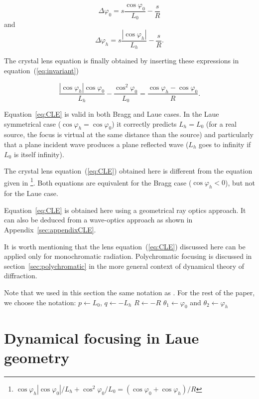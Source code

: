 \documentclass[preprint]{iucr}              %
\newcommand{\inblue}[1]{{\color{blue}#1}}
\begin{document}
\begin{equation}
\label{angles}
\Delta \varphi_0 = s \frac{\cos\varphi_0}{L_0} - \frac{s}{R}
\end{equation}
and 
\begin{equation}
\Delta \varphi_h = s \frac{|\cos\varphi_h|}{L_h} - \frac{s}{R}.
\end{equation}

The crystal lens equation is finally obtained by inserting these expressions in equation~(\ref{eq:invariant})

\begin{equation}
\label{eq:CLE}
\frac{|\cos\varphi_h| \cos\varphi_0}{L_h} - \frac{\cos^2\varphi_0}{L_0} = \frac{\cos\varphi_h - \cos\varphi_0}{R}.
\end{equation}


Equation~\ref{eq:CLE} is valid in both Bragg and Laue cases. In the Laue symmetrical case ($\cos\varphi_h=\cos\varphi_0$) it correctly predicts $L_h=L_0$ \inblue{(for a real source, the focus is virtual at the same distance than the source)} and particularly that a plane incident wave produces a plane reflected wave ($L_h$ goes to infinity if $L_0$ is itself infinity).

The crystal lens equation~(\ref{eq:CLE}) obtained here is different from the equation given in \cite{CK}\footnote{ 
$
\cos\varphi_h |\cos\varphi_0|/L_h + \cos^2\varphi_0/L_0 = (\cos\varphi_0 + \cos\varphi_h)/R 
$}. Both equations are equivalent for the Bragg case ($\cos\varphi_h<0$), but not for the Laue case.

Equation~\ref{eq:CLE} is obtained here using a geometrical ray optics approach. It can also be deduced from a \inblue{wave-optics} approach as shown in Appendix~\ref{sec:appendixCLE}. 

\inblue{It is worth mentioning that the lens equation~(\ref{eq:CLE}) discussed here can be applied only for monochromatic radiation. Polychromatic focusing is discussed in section~\ref{sec:polychromatic} in the more general context of dynamical theory of diffraction.

Note that we used in this section the same notation as \cite{CK}. For the rest of the paper, we choose the notation:    $p \leftarrow L_0$, $q \leftarrow -L_h$ $R \leftarrow -R$ $\theta_1 \leftarrow \varphi_0$ and $\theta_2 \leftarrow \varphi_h$ }

\section{Dynamical focusing in Laue geometry}
\label{sec:dynamlicalLaue}
\end{document}
